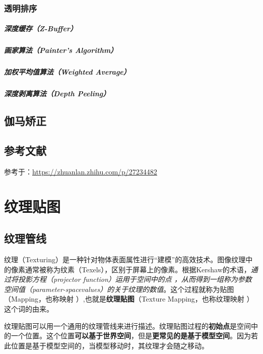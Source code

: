 \documentclass[UTF8,a4paper,12pt]{ctexbook}
\begin{document}
		\subsection{透明排序}
			\paragraph{深度缓存（Z-Buffer）}
			
			\paragraph{画家算法（Painter's Algorithm）}
			
			\paragraph{加权平均值算法（Weighted Average）}
			
			\paragraph{深度剥离算法（Depth Peeling）}

	\section{伽马矫正}
	
	\section{参考文献}
			参考于：\url{https://zhuanlan.zhihu.com/p/27234482}
			
\chapter{纹理贴图}
	\section{纹理管线}
		纹理（Texturing）是一种针对物体表面属性进行“建模”的高效技术。图像纹理中的像素通常被称为纹素（Texels），区别于屏幕上的像素。根据Kershaw的术语，\textit{通过将投影方程（projector function）运用于空间中的点 ，从而得到一组称为参数空间值（parameter-spacevalues）的关于纹理的数值}。这个过程就称为贴图（Mapping，也称映射 ）,也就是\textbf{纹理贴图}（Texture Mapping，也称纹理映射 ）这个词的由来。
		
		纹理贴图可以用一个通用的纹理管线来进行描述。纹理贴图过程的\textbf{初始点}是空间中的一个位置。这个位置\textbf{可以基于世界空间}，但是\textbf{更常见的是基于模型空间}。因为若此位置是基于模型空间的，当模型移动时，其纹理才会随之移动。
		
\end{document}
